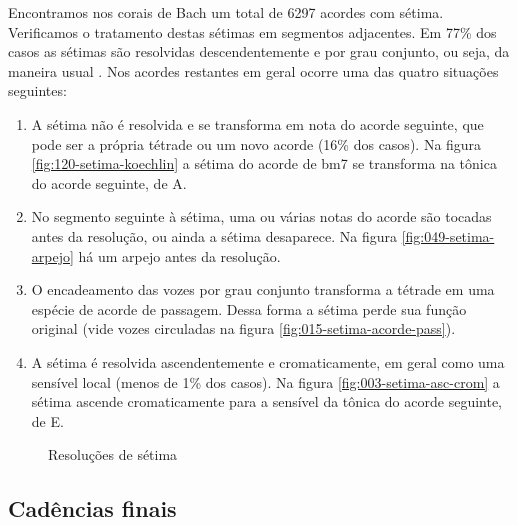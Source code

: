 Encontramos nos corais de Bach um total de 6297 acordes com sétima.
Verificamos o tratamento destas sétimas em  segmentos adjacentes. Em 77\% dos casos as
sétimas são resolvidas descendentemente e por grau conjunto, ou seja,
da maneira usual \cite[p. 207]{kostka.ea00:tonal}.  Nos acordes
restantes em geral ocorre uma das quatro situações seguintes:

\begin{enumerate}
\item A sétima não é resolvida e se transforma em nota do acorde
  seguinte, que pode ser a própria tétrade ou um novo acorde (16\% dos
  casos). Na figura \ref{fig:120-setima-koechlin} a sétima do acorde
  de bm7 se transforma na tônica do acorde seguinte, de A.
\item No segmento seguinte à sétima, uma ou várias notas do acorde são
  tocadas antes da resolução, ou ainda a sétima desaparece. Na figura
  \ref{fig:049-setima-arpejo} há um arpejo antes da resolução.
\item O encadeamento das vozes por grau conjunto transforma a tétrade
  em uma espécie de acorde de passagem. Dessa forma a sétima perde sua
  função original (vide vozes circuladas na figura
  \ref{fig:015-setima-acorde-pass}).
\item A sétima é resolvida ascendentemente e cromaticamente, em geral
  como uma sensível local (menos de 1\% dos casos). Na figura
  \ref{fig:003-setima-asc-crom} a sétima ascende cromaticamente para a
  sensível da tônica do acorde seguinte, de E.
\end{enumerate}

\begin{figure}
  \centering
  \caption{Resoluções de sétima}
  \label{fig:setima-resol}
\end{figure}

\subsection{Cadências finais}
\label{sec:cadencias}


